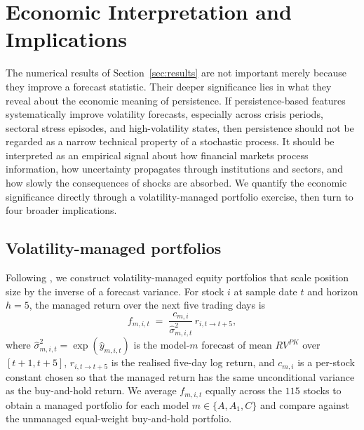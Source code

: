 \documentclass[11pt,a4paper]{article}
\begin{document}
\section{Economic Interpretation and Implications}
\label{sec:economic}

The numerical results of Section~\ref{sec:results} are not important
merely because they improve a forecast statistic. Their deeper
significance lies in what they reveal about the economic meaning of
persistence. If persistence-based features systematically improve
volatility forecasts, especially across crisis periods, sectoral stress
episodes, and high-volatility states, then persistence should not be
regarded as a narrow technical property of a stochastic process. It
should be interpreted as an empirical signal about how financial markets
process information, how uncertainty propagates through institutions and
sectors, and how slowly the consequences of shocks are absorbed. We
quantify the economic significance directly through a
volatility-managed portfolio exercise, then turn to four broader
implications.

\subsection{Volatility-managed portfolios}
\label{subsec:volmanaged}

Following \citet{moreira2017volatility}, we construct
volatility-managed equity portfolios that scale position size by the
inverse of a forecast variance. For stock $i$ at sample date $t$ and
horizon $h=5$, the managed return over the next five trading days is
\begin{equation}
  f_{m,i,t} \;=\; \frac{c_{m,i}}{\hat\sigma^2_{m,i,t}}\,r_{i,t\to t+5},
\end{equation}
where $\hat\sigma^2_{m,i,t} = \exp(\hat y_{m,i,t})$ is the model-$m$
forecast of mean $RV^{PK}$ over $[t+1,t+5]$, $r_{i,t\to t+5}$ is the
realised five-day log return, and $c_{m,i}$ is a per-stock constant
chosen so that the managed return has the same unconditional variance
as the buy-and-hold return. We average $f_{m,i,t}$ equally across the
$115$ stocks to obtain a managed portfolio for each model
$m\in\{A,A_1,C\}$ and compare against the unmanaged equal-weight
buy-and-hold portfolio.
\end{document}
